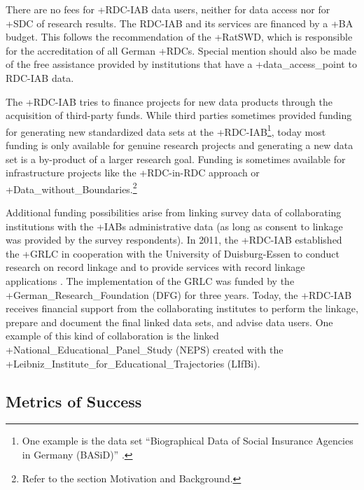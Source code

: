 \documentclass[
]{book}
\begin{document}
There are no fees for +RDC-IAB\textbar{} data users, neither for data access nor for +SDC\textbar{} of research results. The RDC-IAB and its services are financed by a +BA\textbar{} budget. This follows the recommendation of the +RatSWD\textbar, which is responsible for the accreditation of all German +RDC\textbar s. Special mention should also be made of the free assistance provided by institutions that have a +data\_access\_point\textbar{} to RDC-IAB data.

The +RDC-IAB\textbar{} tries to finance projects for new data products through the acquisition of third-party funds. While third parties sometimes provided funding for generating new standardized data sets at the +RDC-IAB\textbar{}\footnote{One example is the data set ``Biographical Data of Social Insurance Agencies in Germany (BASiD)'' \citep{hochfellner2012}.}, today most funding is only available for genuine research projects and generating a new data set is a by-product of a larger research goal. Funding is sometimes available for infrastructure projects like the +RDC-in-RDC\textbar{} approach or +Data\_without\_Boundaries\textbar.\footnote{Refer to the section Motivation and Background.}

Additional funding possibilities arise from linking survey data of collaborating institutions with the +IAB\textbar s administrative data (as long as consent to linkage was provided by the survey respondents). In 2011, the +RDC-IAB\textbar{} established the +GRLC\textbar{} in cooperation with the University of Duisburg-Essen to conduct research on record linkage and to provide services with record linkage applications \citep{antoni2019}. The implementation of the GRLC was funded by the +German\_Research\_Foundation\textbar{} (DFG) for three years. Today, the +RDC-IAB\textbar{} receives financial support from the collaborating institutes to perform the linkage, prepare and document the final linked data sets, and advise data users. One example of this kind of collaboration is the linked +National\_Educational\_Panel\_Study\textbar{} (NEPS) created with the +Leibniz\_Institute\_for\_Educational\_Trajectories\textbar{} (LIfBi).

\hypertarget{metrics-of-success}{%
\subsection{Metrics of Success}\label{metrics-of-success}}
\end{document}
